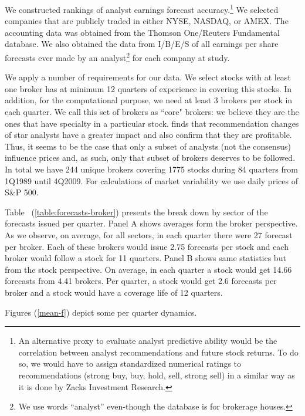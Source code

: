 We constructed rankings of analyst earnings forecast accuracy.\footnote{An alternative proxy to evaluate analyst predictive ability would be the correlation between analyst recommendations and future stock returns. To do so, we would have to assign standardized numerical ratings to recommendations (strong buy, buy, hold, sell, strong sell) in a similar way as it is done by Zacks Investment Research.}
We selected companies that are publicly traded in either NYSE, NASDAQ, or AMEX. The accounting data was obtained from the Thomson One/Reuters Fundamental database. We also obtained the data from I/B/E/S of all earnings per share forecasts ever made by an analyst\footnote{We use words ``analyst''  even-though the database is for brokerage houses.}  for each company at study. 

We apply a number of requirements for our data. We select stocks with at least one broker has at minimum 12 quarters of experience in covering this stocks. In addition, for the computational purpose, we need at least 3 brokers per stock in each quarter.  We call this set of brokers as ``core" brokers: we believe they are  the ones that have specialty in a particular stock. \cite{stickel1995} finds that recommendation changes of star analysts have a greater impact and \cite{fang2008aso} also confirm that they are profitable. Thus, it seems to be the case that only a subset of analysts (not the consensus) influence prices and, as such, only that subset of brokers deserves to be followed. In total we have 244 unique brokers covering 1775 stocks during 84  quarters from 1Q1989 until 4Q2009. For calculations of market variability we use daily prices of S\&P 500.  


Table ~(\ref{table:forecasts-broker}) presents the break down by sector of the forecasts issued per quarter.  Panel A shows averages form the broker perspective. As we observe, on average, for all sectors, in each quarter there were 27 forecast per broker. Each of these brokers would issue 2.75 forecasts per stock and each broker would follow a stock for 11 quarters. Panel B shows same statistics but from the stock perspective.  On average, in each quarter a stock would get 14.66 forecasts from 4.41 brokers. Per quarter, a stock would get 2.6 forecasts per broker and a stock would have a coverage life of 12 quarters. 

Figures (\ref{mean-f}) depict some per quarter dynamics. %



